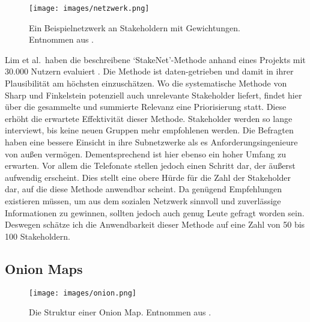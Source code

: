 \begin{figure*}[htp]
  \centering
  \texttt{[image: images/netzwerk.png]}
  \caption{Ein Beispielnetzwerk an Stakeholdern mit Gewichtungen. Entnommen aus \cite{stakenet}.}
\end{figure*}

Lim et al.\ haben die beschreibene `StakeNet'-Methode anhand eines Projekts mit 30.000 Nutzern evaluiert \cite{stakenet}. Die Methode ist daten-getrieben und damit in ihrer Plausibilität am höchsten einzuschätzen. Wo die systematische Methode von Sharp und Finkelstein \cite{sharp} potenziell auch unrelevante Stakeholder liefert, findet hier über die gesammelte und summierte Relevanz eine Priorisierung statt. Diese erhöht die erwartete Effektivität dieser Methode. Stakeholder werden so
lange interviewt, bis keine neuen Gruppen mehr empfohlenen werden. Die Befragten haben eine bessere Einsicht in ihre Subnetzwerke als es Anforderungsingenieure von außen vermögen. Dementsprechend ist hier ebenso ein hoher Umfang zu erwarten. Vor allem die Telefonate stellen jedoch einen Schritt dar, der äußerst aufwendig erscheint. Dies stellt eine obere Hürde für die Zahl der Stakeholder dar, auf die diese Methode anwendbar scheint. Da genügend Empfehlungen existieren müssen, um
aus dem sozialen Netzwerk sinnvoll und zuverlässige Informationen zu gewinnen, sollten jedoch auch genug Leute gefragt worden sein. Deswegen schätze ich die Anwendbarkeit dieser Methode auf eine Zahl von 50 bis 100 Stakeholdern.

\subsection{Onion Maps}

\begin{figure}[H]
  \centering
  \texttt{[image: images/onion.png]}
  \caption{Die Struktur einer Onion Map. Entnommen aus \cite{alexander}.}
\end{figure}

